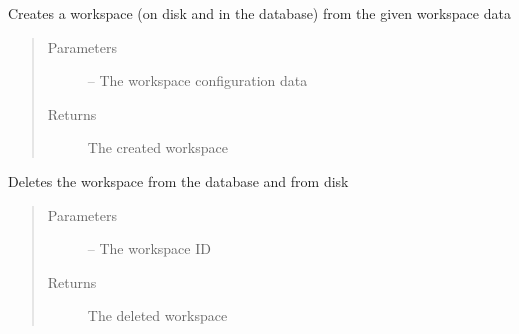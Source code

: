 \documentclass[letterpaper,10pt,english]{sphinxmanual}
\begin{document}

\begin{fulllineitems}
\label{_source/son_editor.impl:son_editor.impl.workspaceimpl.create_workspace}
Creates a workspace (on disk and in the database) from the given workspace data
\begin{quote}\begin{description}
\item[{Parameters}] \leavevmode
{} -- The workspace configuration data

\item[{Returns}] \leavevmode
The created workspace

\end{description}\end{quote}

\end{fulllineitems}


\begin{fulllineitems}
\label{_source/son_editor.impl:son_editor.impl.workspaceimpl.delete_workspace}
Deletes the workspace from the database and from disk
\begin{quote}\begin{description}
\item[{Parameters}] \leavevmode
{} -- The workspace ID

\item[{Returns}] \leavevmode
The deleted workspace

\end{description}\end{quote}

\end{fulllineitems}

\end{document}

